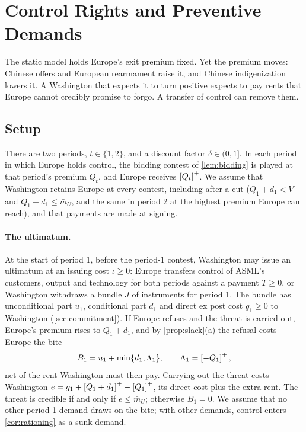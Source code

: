 \section{Control Rights and Preventive Demands}\label{sec:control}

The static model holds Europe's exit premium fixed. Yet the premium moves: Chinese offers and European rearmament raise it, and Chinese indigenization lowers it. A Washington that expects it to turn positive expects to pay rents that Europe cannot credibly promise to forgo. A transfer of control can remove them.

\subsection{Setup}\label{sec:controlsetup}

There are two periods, $t\in\{1,2\}$, and a discount factor $\delta\in(0,1]$. In each period in which Europe holds control, the bidding contest of \cref{lem:bidding} is played at that period's premium $Q_t$, and Europe receives $\left[Q_t\right]^{+}$. We assume that Washington retains Europe at every contest, including after a cut ($Q_1+d_1<V$ and $Q_1+d_1\le\bar m_U$, and the same in period 2 at the highest premium Europe can reach), and that payments are made at signing.

\paragraph{The ultimatum.} At the start of period 1, before the period-1 contest, Washington may issue an ultimatum at an issuing cost $\iota\ge 0$: Europe transfers control of ASML's customers, output and technology for both periods against a payment $T\ge 0$, or Washington withdraws a bundle $J$ of instruments for period 1. The bundle has unconditional part $u_1$, conditional part $d_1$ and direct ex post cost $g_1\ge 0$ to Washington (\cref{sec:commitment}). If Europe refuses and the threat is carried out, Europe's premium rises to $Q_1+d_1$, and by \cref{prop:slack}(a) the refusal costs Europe the bite
\[
B_1=u_1+\min\{d_1,\Lambda_1\},\qquad \Lambda_1=\left[-Q_1\right]^{+},
\]
net of the rent Washington must then pay. Carrying out the threat costs Washington $e=g_1+\left[Q_1+d_1\right]^{+}-\left[Q_1\right]^{+}$, its direct cost plus the extra rent. The threat is credible if and only if $e\le\bar m_U$; otherwise $B_1=0$. We assume that no other period-1 demand draws on the bite; with other demands, control enters \cref{cor:rationing} as a sunk demand.


